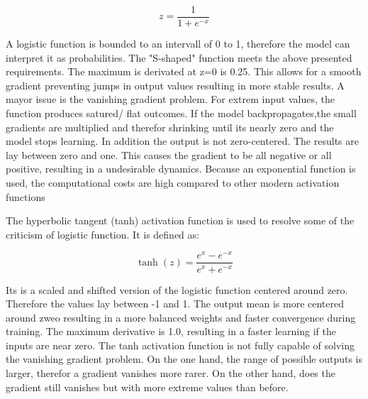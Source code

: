 \begin{equation}
    z = \frac{1}{1 + e^{-x}}
\end{equation}




A logistic function is bounded to an intervall of 0 to 1, therefore the model can interpret it as probabilities.
The "S-shaped" function meets the above presented requirements.
The maximum is derivated at z=0 is 0.25.
This allows for a smooth gradient preventing jumps in output values resulting in more stable results.
A mayor issue is the vanishing gradient problem.
For extrem input values, the function produces satured/ flat outcomes. 
If the model backpropagates,the small gradients are multiplied and therefor shrinking until its nearly zero and the model stops learning.
In addition the output is not zero-centered. The results are lay between zero and one. 
This causes the gradient to be all negative or all positive, resulting in a undesirable dynamics.
Because an exponential function is used, the computational costs are high compared to other modern activation functions


The hyperbolic tangent (tanh) activation function is used to resolve some of the criticism of logistic function. 
It is defined as: 

\begin{equation}
    \tanh(z) = \frac{e^{x} - e^{-x}}{e^{x} + e^{-x}}
\end{equation}




Its is a scaled and shifted version of the logistic function centered around zero.
Therefore the values lay between -1 and 1. 
The output mean is more centered around zweo resulting in a more balanced weights and faster convergence during training.
The maximum derivative is 1.0, resulting in a faster learning if the inputs are near zero.
The tanh activation function is not fully capable of solving the vanishing gradient problem.
On the one hand, the range of possible outputs is larger, therefor a gradient vanishes more rarer.
On the other hand, does the gradient still vanishes but with more extreme values than before.


